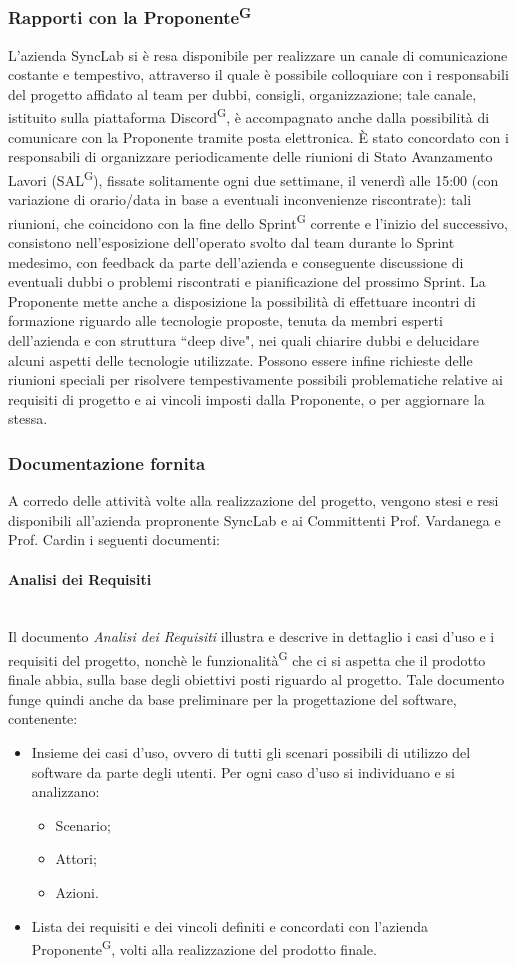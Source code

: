 \documentclass[8pt]{article}
\newcommand{\glossterm}[1]{#1\textsuperscript{G}} %
\newcommand{\subsubsubsection}[1]{\paragraph{#1}\mbox{}\\}
\begin{document}
\subsubsection{Rapporti con la \glossterm{Proponente}} 
L'azienda SyncLab si è resa disponibile per realizzare un canale di comunicazione costante e
tempestivo, attraverso il quale è possibile colloquiare con i responsabili del progetto affidato al
team per dubbi, consigli, organizzazione; tale canale, istituito sulla piattaforma
\glossterm{Discord}, è accompagnato anche dalla possibilità di comunicare con la Proponente tramite
posta elettronica. È stato concordato con i responsabili di organizzare periodicamente delle
riunioni di Stato Avanzamento Lavori (\glossterm{SAL}), fissate solitamente ogni due settimane, il
venerdì alle 15:00 (con variazione di orario/data in base a eventuali inconvenienze riscontrate):
tali riunioni, che coincidono con la fine dello \glossterm{Sprint} corrente e l'inizio del
successivo, consistono nell'esposizione dell'operato svolto dal team durante lo Sprint medesimo, con
feedback da parte dell'azienda e conseguente discussione di eventuali dubbi o problemi
riscontrati e pianificazione del prossimo Sprint.
La Proponente mette anche a disposizione la possibilità di effettuare incontri di formazione
riguardo alle tecnologie proposte, tenuta da membri esperti dell'azienda e con struttura ``deep
dive", nei quali chiarire dubbi e delucidare alcuni aspetti delle tecnologie utilizzate. 
Possono essere infine richieste delle riunioni speciali per risolvere tempestivamente possibili
problematiche relative ai requisiti di progetto e ai vincoli imposti dalla Proponente, o per
aggiornare la stessa.
\clearpage
\subsubsection{Documentazione fornita}
A corredo delle attività volte alla realizzazione del progetto, vengono stesi e resi disponibili
all'azienda propronente SyncLab e ai Committenti Prof. Vardanega e Prof. Cardin i seguenti documenti:
\subsubsubsection{Analisi dei Requisiti} \label{sec:ar1}
Il documento \textit{Analisi dei Requisiti }illustra e descrive in dettaglio i casi d'uso e i requisiti del progetto, nonchè le \glossterm{funzionalità} che ci si aspetta che il prodotto finale abbia, sulla base degli obiettivi posti riguardo al progetto. Tale documento funge quindi anche da base preliminare per la progettazione del software, contenente:
\begin{itemize}
    \item Insieme dei casi d'uso, ovvero di tutti gli scenari possibili di utilizzo del software da
        parte degli utenti. Per ogni caso d'uso si individuano e si analizzano: 
    \begin{itemize}
        \item Scenario;
        \item Attori;
        \item Azioni.
    \end{itemize} 
    \item Lista dei requisiti e dei vincoli definiti e concordati con l'azienda \glossterm{Proponente}, volti alla realizzazione del prodotto finale.
\end{itemize}
\end{document}
